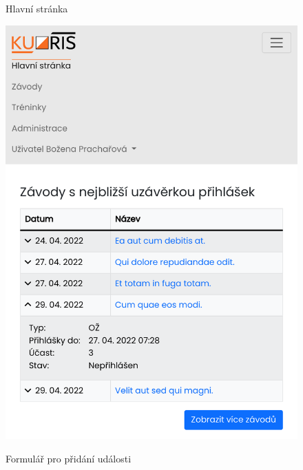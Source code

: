 \begin{figure}[h]
    \centering
    \begin{minipage}[b]{0.48\linewidth}
        \caption{Hlavní stránka}
        \label{figure:homepage-responsive-layout}
        \includegraphics[width=\linewidth]{images/homepage-responsive-layout.pdf}
    \end{minipage}
    \hfill
    \begin{minipage}[b]{0.48\linewidth}
        \caption{Formulář pro přidání události}
        \label{figure:form-responsive-layout}

\end{minipage}
\end{figure}
